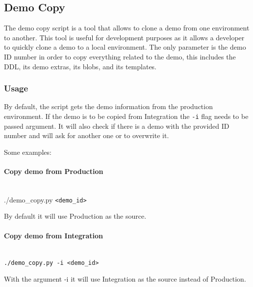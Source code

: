 \subsection{Demo Copy}

The demo copy script is a tool that allows to clone a demo from one environment to another. This tool is useful for development purposes
as it allows a developer to quickly clone a demo to a local environment. The only parameter is the demo ID number in order to copy
everything related to the demo, this includes the DDL, its demo extras, its blobs, and its templates.

\subsubsection{Usage}
By default, the script gets the demo information from the production environment. If the demo is to be copied from Integration the {\tt -i} flag needs to be passed argument.
It will also check if there is a demo with the provided ID number and will ask for another one or to overwrite it.

Some examples:
\paragraph{Copy demo from Production} \hspace{0pt} \\
./demo\_copy.py {\tt <demo\_id>}

By default it will use Production as the source.

\paragraph{Copy demo from Integration} \hspace{0pt} \\
{\tt ./demo\_copy.py -i {\tt <demo\_id>}}

With the argument -i it will use Integration as the source instead of Production.
